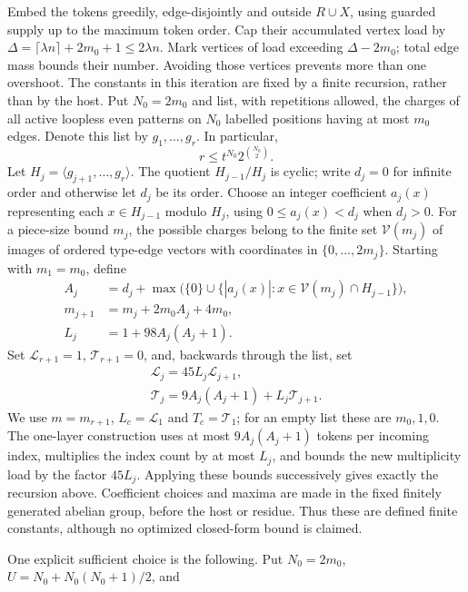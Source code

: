 \documentclass[english,11pt,a4paper]{article}
\begin{document}
Embed the tokens greedily, edge-disjointly and outside \(R\cup X\), using guarded supply up to the maximum token order. Cap their accumulated vertex load by \(\Delta=\lceil\lambda n\rceil+2m_0+1\le2\lambda n\). Mark vertices of load exceeding \(\Delta-2m_0\); total edge mass bounds their number. Avoiding those vertices prevents more than one overshoot. The constants in this iteration are fixed by a finite recursion, rather than by the host. Put \(N_0=2m_0\) and list, with repetitions allowed, the charges of all active loopless even patterns on \(N_0\) labelled positions having at most \(m_0\) edges. Denote this list by \(g_1,\ldots,g_r\). In particular, \[r\le t^{N_0}2^{\binom{N_0}{2}}.\] Let \(H_j=\langle g_{j+1},\ldots,g_r\rangle\). The quotient \(H_{j-1}/H_j\) is cyclic; write \(d_j=0\) for infinite order and otherwise let \(d_j\) be its order. Choose an integer coefficient \(a_j(x)\) representing each \(x\in H_{j-1}\) modulo \(H_j\), using \(0\le a_j(x)<d_j\) when \(d_j>0\). For a piece-size bound \(m_j\), the possible charges belong to the finite set \(\mathcal V(m_j)\) of images of ordered type-edge vectors with coordinates in \(\{0,\ldots,2m_j\}\). Starting with \(m_1=m_0\), define \[\begin{aligned}
A_j&=d_j+\max\bigl(\{0\}\cup\{|a_j(x)|:x\in\mathcal V(m_j)\cap H_{j-1}\}\bigr),\\
m_{j+1}&=m_j+2m_0A_j+4m_0,\\
L_j&=1+98A_j(A_j+1).
\end{aligned}\] Set \(\mathcal L_{r+1}=1\), \(\mathcal T_{r+1}=0\), and, backwards through the list, set \[\begin{gathered}
\mathcal L_j=45L_j\mathcal L_{j+1},\\
\mathcal T_j=9A_j(A_j+1)+L_j\mathcal T_{j+1}.
\end{gathered}\] We use \(m=m_{r+1}\), \(L_c=\mathcal L_1\) and \(T_c=\mathcal T_1\); for an empty list these are \(m_0,1,0\). The one-layer construction uses at most \(9A_j(A_j+1)\) tokens per incoming index, multiplies the index count by at most \(L_j\), and bounds the new multiplicity load by the factor \(45L_j\). Applying these bounds successively gives exactly the recursion above. Coefficient choices and maxima are made in the fixed finitely generated abelian group, before the host or residue. Thus these are defined finite constants, although no optimized closed-form bound is claimed.

One explicit sufficient choice is the following. Put \(N_0=2m_0\), \(U=N_0+N_0(N_0+1)/2\), and
\end{document}
